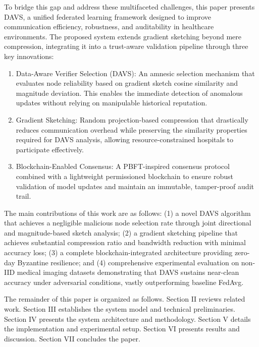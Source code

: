 \documentclass[conference]{IEEEtran}
\begin{document}
To bridge this gap and address these multifaceted challenges, this paper presents DAVS, a unified federated learning framework designed to improve communication efficiency, robustness, and auditability in healthcare environments. The proposed system extends gradient sketching beyond mere compression, integrating it into a trust-aware validation pipeline through three key innovations:

\begin{enumerate}
    \item Data-Aware Verifier Selection (DAVS): An amnesic selection mechanism that evaluates node reliability based on gradient sketch cosine similarity and magnitude deviation. This enables the immediate detection of anomalous updates without relying on manipulable historical reputation.
    \item Gradient Sketching: Random projection-based compression that drastically reduces communication overhead while preserving the similarity properties required for DAVS analysis, allowing resource-constrained hospitals to participate effectively.
    \item Blockchain-Enabled Consensus: A PBFT-inspired consensus protocol combined with a lightweight permissioned blockchain to ensure robust validation of model updates and maintain an immutable, tamper-proof audit trail.
\end{enumerate}

The main contributions of this work are as follows: (1) a novel DAVS algorithm that achieves a negligible malicious node selection rate through joint directional and magnitude-based sketch analysis; (2) a gradient sketching pipeline that achieves substantial compression ratio and bandwidth reduction with minimal accuracy loss; (3) a complete blockchain-integrated architecture providing zero-day Byzantine resilience; and (4) comprehensive experimental evaluation on non-IID medical imaging datasets demonstrating that DAVS sustains near-clean accuracy under adversarial conditions, vastly outperforming baseline FedAvg.

The remainder of this paper is organized as follows. Section II reviews related work. Section III establishes the system model and technical preliminaries. Section IV presents the system architecture and methodology. Section V details the implementation and experimental setup. Section VI presents results and discussion. Section VII concludes the paper.

\end{document}
